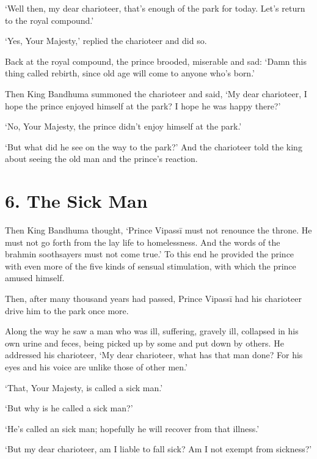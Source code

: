 \documentclass[12pt,openany]{book}%
\begin{document}
‘Well then, my dear charioteer, that’s enough of the park for today. Let’s return to the royal compound.’ 

‘Yes, Your Majesty,’ replied the charioteer and did so. 

Back at the royal compound, the prince brooded, miserable and sad: ‘Damn this thing called rebirth, since old age will come to anyone who’s born.’ 

Then King Bandhuma summoned the charioteer and said, ‘My dear charioteer, I hope the prince enjoyed himself at the park? I hope he was happy there?’ 

‘No, Your Majesty, the prince didn’t enjoy himself at the park.’ 

‘But what did he see on the way to the park?’ And the charioteer told the king about seeing the old man and the prince’s reaction. 

\section*{6. The Sick Man }

Then King Bandhuma thought, ‘Prince \textsanskrit{Vipassī} must not renounce the throne. He must not go forth from the lay life to homelessness. And the words of the brahmin soothsayers must not come true.’ To this end he provided the prince with even more of the five kinds of sensual stimulation, with which the prince amused himself. 

Then, after many thousand years had passed, Prince \textsanskrit{Vipassī} had his charioteer drive him to the park once more. 

Along the way he saw a man who was ill, suffering, gravely ill, collapsed in his own urine and feces, being picked up by some and put down by others. He addressed his charioteer, ‘My dear charioteer, what has that man done? For his eyes and his voice are unlike those of other men.’ 

‘That, Your Majesty, is called a sick man.’ 

‘But why is he called a sick man?’ 

‘He’s called an sick man; hopefully he will recover from that illness.’ 

‘But my dear charioteer, am I liable to fall sick? Am I not exempt from sickness?’ 
\end{document}
